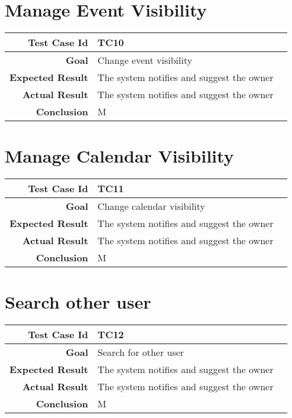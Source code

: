 \section{Manage Event Visibility}
\begin{tabularx}{\linewidth}{|r|X|X|}
\hline   {\bf Test Case Id} &  TC10\\
  \hline  {\bf Goal} & Change event visibility\\
  
  \hline  {\bf Expected Result} & The system notifies and suggest the owner\\
  \hline  {\bf Actual Result} & The system notifies and suggest the owner\\
  \hline  {\bf Conclusion} & M\\
  \hline
  
\end{tabularx}

\section{Manage Calendar Visibility}
\begin{tabularx}{\linewidth}{|r|X|X|}
\hline   {\bf Test Case Id} &  TC11\\
  \hline  {\bf Goal} & Change calendar visibility\\
  
  \hline  {\bf Expected Result} & The system notifies and suggest the owner\\
  \hline  {\bf Actual Result} & The system notifies and suggest the owner\\
  \hline  {\bf Conclusion} & M\\
  \hline
  
\end{tabularx}
\section{Search other user}
\begin{tabularx}{\linewidth}{|r|X|X|}
\hline   {\bf Test Case Id} &  TC12\\
  \hline  {\bf Goal} & Search for other user\\
  
  \hline  {\bf Expected Result} & The system notifies and suggest the owner\\
  \hline  {\bf Actual Result} & The system notifies and suggest the owner\\
  \hline  {\bf Conclusion} & M\\
  \hline
  
\end{tabularx}
